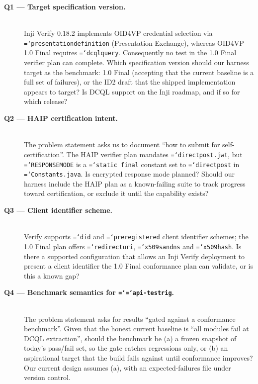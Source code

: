 \documentclass[11pt,a4paper]{article}
\let\origtexttt\texttt
\renewcommand{\texttt}[1]{\origtexttt{\hyphenchar\font=`\-\relax #1}}
\renewcommand{\_}{\textunderscore\allowbreak}
\begin{document}
\begin{description}

\item[\textbf{Q1 --- Target specification version.}]\mbox{}\\
Inji Verify 0.18.2 implements OID4VP credential selection via \texttt{presentation\_definition}
(Presentation Exchange), whereas OID4VP 1.0 Final requires \texttt{dcql\_query}. Consequently
no test in the 1.0 Final verifier plan can complete. Which specification version should our
harness target as the benchmark: 1.0 Final (accepting that the current baseline is a full
set of failures), or the ID2 draft that the shipped implementation appears to target? Is
DCQL support on the Inji roadmap, and if so for which release?

\item[\textbf{Q2 --- HAIP certification intent.}]\mbox{}\\
The problem statement asks us to document ``how to submit for self-certification''. The HAIP
verifier plan mandates \texttt{direct\_post.jwt}, but \texttt{RESPONSE\_MODE} is a
\texttt{static final} constant set to \texttt{direct\_post} in \texttt{Constants.java}. Is
encrypted response mode planned? Should our harness include the HAIP plan as a
known-failing suite to track progress toward certification, or exclude it until the
capability exists?

\item[\textbf{Q3 --- Client identifier scheme.}]\mbox{}\\
Verify supports \texttt{did} and \texttt{pre\_registered} client identifier schemes; the 1.0
Final plan offers \texttt{redirect\_uri}, \texttt{x509\_san\_dns} and \texttt{x509\_hash}.
Is there a supported configuration that allows an Inji Verify deployment to present a
client identifier the 1.0 Final conformance plan can validate, or is this a known gap?

\item[\textbf{Q4 --- Benchmark semantics for \texttt{api-testrig}.}]\mbox{}\\
The problem statement asks for results ``gated against a conformance benchmark''. Given that
the honest current baseline is ``all modules fail at DCQL extraction'', should the benchmark
be (a) a frozen snapshot of today's pass/fail set, so the gate catches regressions only, or
(b) an aspirational target that the build fails against until conformance improves? Our
current design assumes (a), with an expected-failures file under version control.


\end{description}
\end{document}
